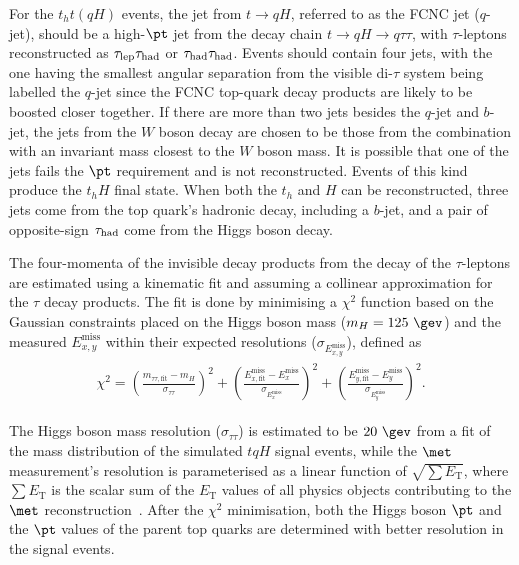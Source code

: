 For the $t_ht(qH)$ events, the jet from $t\to qH$, referred to as the FCNC jet ($q$-jet), should be a high-$\pt$ jet from the
decay chain $t\to qH\to q\tau\tau$, with $\tau$-leptons reconstructed as $\tau_{\mathrm{lep}} \tau_{\mathrm{had}}$ or $\tau_{\mathrm{had}} \tau_{\mathrm{had}}$.
Events should contain four jets, with the one having the smallest angular separation from the visible di-$\tau$ system being labelled the $q$-jet since the FCNC top-quark decay products are likely to be boosted closer together. 
If there are more than two jets besides the $q$-jet and $b$-jet, the jets from the $W$ boson decay are chosen to be those from the combination
with an invariant mass closest to the $W$ boson mass. It is possible that one of the jets fails the $\pt$ requirement and is not reconstructed.
Events of this kind produce the $t_hH$ final state.
When both the $t_h$ and $H$ can be reconstructed, three jets come from the top quark's hadronic decay, including a $b$-jet, and a pair of opposite-sign $\tau_{\mathrm{had}}$ come from the Higgs boson decay.  

The four-momenta of the invisible decay products from the decay of the $\tau$-leptons 
are estimated using a kinematic fit and assuming a collinear approximation for the $\tau$ decay products.
The fit is done by minimising a $\chi^2$ function based on the Gaussian constraints placed on the Higgs boson mass ($m_H=125~\gev$) and the
measured $E_{x,y}^{\text{miss}}$  within their expected resolutions ($\sigma_{E_{x,y}^{\text{miss}}}$), defined as
\begin{eqnarray}
\begin{array}{ll}
\chi^2 =
\left( \frac{m_{\tau\tau,\text{fit}} - m_{H}}{\sigma_{\tau\tau}} \right)^2 +
\left( \frac{E_{x,\text{fit}}^{\text{miss}} - E_{x}^{\text{miss}}}{\sigma_{E_{x}^{\text{miss}}}} \right)^2
  +\left( \frac{E_{y,\text{fit}}^{\text{miss}} - E_{y}^{\text{miss}}}{\sigma_{E_{y}^{\text{miss}}}} \right)^2.
\end{array}
\label{eq:eq1}
\end{eqnarray}

The Higgs boson mass resolution ($\sigma_{\tau\tau}$) is estimated to be $20~\gev$ from a fit of the mass
distribution of the simulated  $tqH$ signal events, while the $\met$ measurement's resolution is parameterised as a linear function of 
$\sqrt{\sum E_{\text{T}}}$, where $\sum E_{\text{T}}$ is the scalar sum of the $E_{\text{T}}$ values of all physics objects contributing to the $\met$ reconstruction~\cite{Aaboud:2018tkc}.
After the $\chi^2$ minimisation, both the Higgs boson $\pt$ and the 
$\pt$ values of the parent top quarks are determined with better resolution in the signal events. 

